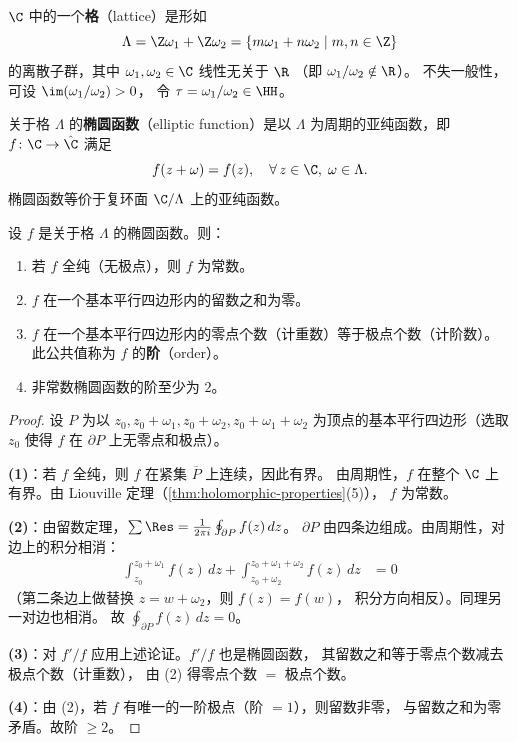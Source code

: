 \begin{definition}[格]
\label{def:lattice}
$\C$ 中的一个\textbf{格}（lattice）是形如
\[
  \Lambda = \Z\omega_1 + \Z\omega_2
  = \{m\omega_1 + n\omega_2 \mid m, n \in \Z\}
\]
的离散子群，其中 $\omega_1, \omega_2 \in \C$ 线性无关于 $\R$
（即 $\omega_1/\omega_2 \notin \R$）。
不失一般性，可设 $\im(\omega_1/\omega_2) > 0$，
令 $\tau = \omega_1/\omega_2 \in \HH$。
\end{definition}

\begin{definition}[椭圆函数]
\label{def:elliptic-function}
关于格 $\Lambda$ 的\textbf{椭圆函数}（elliptic function）是以 $\Lambda$
为周期的亚纯函数，即 $f\colon \C \to \hat{\C}$ 满足
\[
  f(z + \omega) = f(z), \quad \forall\, z \in \C,\; \omega \in \Lambda.
\]
椭圆函数等价于复环面 $\C/\Lambda$ 上的亚纯函数。
\end{definition}

\begin{theorem}[椭圆函数的基本性质]
\label{thm:elliptic-basic}
设 $f$ 是关于格 $\Lambda$ 的椭圆函数。则：
\begin{enumerate}
  \item 若 $f$ 全纯（无极点），则 $f$ 为常数。
  \item $f$ 在一个基本平行四边形内的留数之和为零。
  \item $f$ 在一个基本平行四边形内的零点个数（计重数）等于极点个数（计阶数）。
    此公共值称为 $f$ 的\textbf{阶}（order）。
  \item 非常数椭圆函数的阶至少为 $2$。
\end{enumerate}
\end{theorem}

\begin{proof}
设 $P$ 为以 $z_0, z_0 + \omega_1, z_0 + \omega_2, z_0 + \omega_1 + \omega_2$
为顶点的基本平行四边形（选取 $z_0$ 使得 $f$ 在 $\partial P$ 上无零点和极点）。

\textbf{(1)}：若 $f$ 全纯，则 $f$ 在紧集 $\overline{P}$ 上连续，因此有界。
由周期性，$f$ 在整个 $\C$ 上有界。由 Liouville 定理（\cref{thm:holomorphic-properties}(5)），
$f$ 为常数。

\textbf{(2)}：由留数定理，$\sum \Res = \frac{1}{2\pi i} \oint_{\partial P} f(z)\, dz$。
$\partial P$ 由四条边组成。由周期性，对边上的积分相消：
\begin{align}
  \int_{z_0}^{z_0+\omega_1} f(z)\, dz
  + \int_{z_0+\omega_2}^{z_0+\omega_1+\omega_2} f(z)\, dz &= 0
\end{align}
（第二条边上做替换 $z = w + \omega_2$，则 $f(z) = f(w)$，
积分方向相反）。同理另一对边也相消。
故 $\oint_{\partial P} f(z)\, dz = 0$。

\textbf{(3)}：对 $f'/f$ 应用上述论证。$f'/f$ 也是椭圆函数，
其留数之和等于零点个数减去极点个数（计重数），
由 (2) 得零点个数 $=$ 极点个数。

\textbf{(4)}：由 (2)，若 $f$ 有唯一的一阶极点（阶 $= 1$），则留数非零，
与留数之和为零矛盾。故阶 $\geq 2$。
\end{proof}

